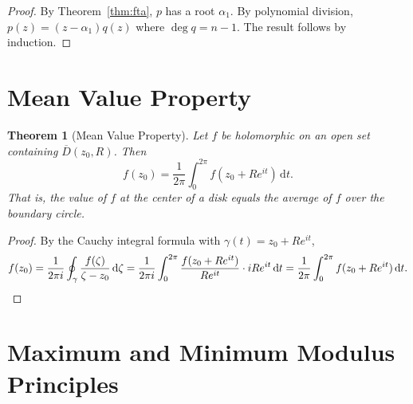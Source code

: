 \documentclass[12pt,a4paper,openany]{book}
\theoremstyle{definition}
\theoremstyle{plain}
\newtheorem{theorem}[definition]{Theorem}
\theoremstyle{remark}
\newcommand{\dd}{\mathrm{d}}
\begin{document}
\begin{proof}
By Theorem~\ref{thm:fta}, $p$ has a root $\alpha_1$. By polynomial division,
$p(z)=(z-\alpha_1)q(z)$ where $\deg q = n-1$. The result follows by induction.
\end{proof}

\section{Mean Value Property}
\label{sec:mean-value}

\begin{theorem}[Mean Value Property]\label{thm:mean-value}
Let $f$ be holomorphic on an open set containing $\overline{D}(z_0,R)$. Then
\begin{equation}\label{eq:mean-value}
  f(z_0) = \frac{1}{2\pi}\int_0^{2\pi}f(z_0+Re^{it})\,\dd t.
\end{equation}
That is, the value of $f$ at the center of a disk equals the average of $f$ over
the boundary circle.
\end{theorem}

\begin{proof}
By the Cauchy integral formula with $\gamma(t)=z_0+Re^{it}$,
\[
  f(z_0) = \frac{1}{2\pi i}\oint_\gamma\frac{f(\zeta)}{\zeta-z_0}\,\dd\zeta
  = \frac{1}{2\pi i}\int_0^{2\pi}\frac{f(z_0+Re^{it})}{Re^{it}}\cdot iRe^{it}\,\dd t
  = \frac{1}{2\pi}\int_0^{2\pi}f(z_0+Re^{it})\,\dd t.\qedhere
\]
\end{proof}

\begin{center}
\end{center}

\section{Maximum and Minimum Modulus Principles}
\label{sec:max-modulus}
\end{document}
